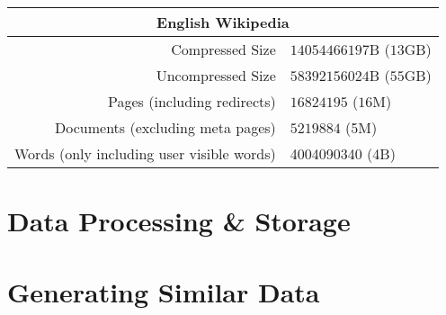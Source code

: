 \documentclass[11pt]{article}
\begin{document}
  \begin{table}[h]
    \begin{center}
      \begin{tabular}{r l}
        \multicolumn{2}{c}{\large \textbf{English Wikipedia}}\\
        \hline
        Compressed Size & $14054466197$B ($13$GB)\\
        Uncompressed Size & $58392156024$B ($55$GB)\\
        Pages (including redirects) & $16824195$ ($16$M)\\
        Documents (excluding meta pages) & $5219884$ (5M)\\
        Words (only including user visible words) & 4004090340 (4B)\\
      \end{tabular}
    \end{center}
  \end{table}

\section*{Data Processing \& Storage}

\section*{Generating Similar Data}

\printbibliography
\end{document}
